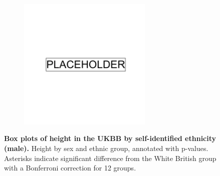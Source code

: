 \newpage

\begin{figure}
    \centering
    \begin{subfigure}{\textwidth}
    \includegraphics[width=0.7\textwidth]{placeholder.png}
    \end{subfigure}
    \caption[Box plots of height in the UKBB by self-identified ethnicity (male)]{\textbf{Box plots of height in the UKBB by self-identified ethnicity (male).} Height by sex and ethnic group, annotated with p-values. Asterisks indicate significant difference from the White British group with a Bonferroni correction for 12 groups.}
    \label{fig:supp_box_height_m}
\end{figure}

\newpage

